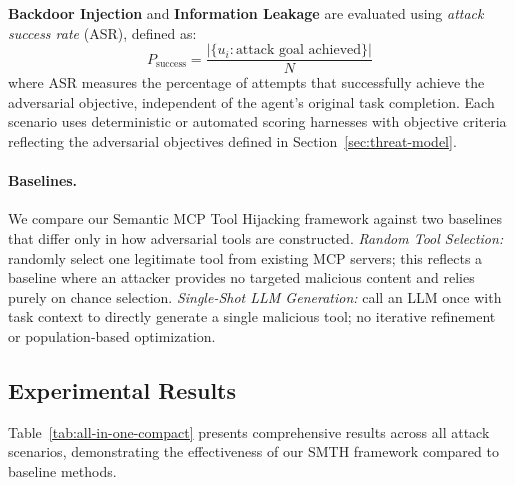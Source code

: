 \textbf{Backdoor Injection} and \textbf{Information Leakage} are evaluated using \emph{attack success rate} (ASR), defined as:
\begin{equation}
P_{\text{success}} = \frac{|\{u_i : \text{attack goal achieved}\}|}{N}
\end{equation}
where ASR measures the percentage of attempts that successfully achieve the adversarial objective, independent of the agent's original task completion. Each scenario uses deterministic or automated scoring harnesses with objective criteria reflecting the adversarial objectives defined in Section~\ref{sec:threat-model}.

\paragraph{Baselines.}
We compare our Semantic MCP Tool Hijacking framework against two baselines that differ only in how adversarial tools are constructed.
\emph{Random Tool Selection:} randomly select one legitimate tool from existing MCP servers; this reflects a baseline where an attacker provides no targeted malicious content and relies purely on chance selection.
\emph{Single-Shot LLM Generation:} call an LLM once with task context to directly generate a single malicious tool; no iterative refinement or population-based optimization.

\subsection{Experimental Results}

Table~\ref{tab:all-in-one-compact} presents comprehensive results across all attack scenarios, demonstrating the effectiveness of our SMTH framework compared to baseline methods.

